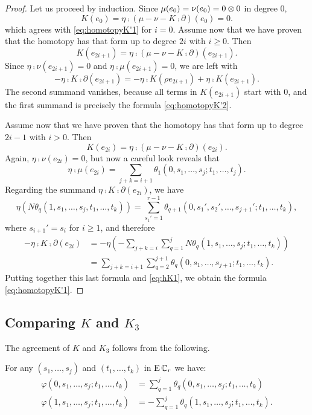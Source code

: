 \begin{proof}
 	Let us proceed by induction.
	Since $\mu(e_0) = \nu(e_0) = 0\otimes 0$ in degree $0$,
	\[
	K(e_0) = \eta \comp (\mu-\nu-K \comp \partial)(e_0) = 0.
	\]
	which agrees with \eqref{eq:homotopyK'1} for $i=0$.
	Assume now that we have proven that the homotopy has that form up to degree $2i$ with $i\geq 0$.
	Then
	\[K(e_{2i+1}) = \eta \comp (\mu-\nu-K \comp \partial)(e_{2i+1}).\]
	Since $\eta \comp \nu(e_{2i+1}) = 0$ and $\eta \comp \mu(e_{2i+1}) = 0$, we are left with
	\[-\eta \comp K \comp \partial(e_{2i+1}) = -\eta \comp K (\rho e_{2i+1}) + \eta \comp K (e_{2i+1}).
	\]
	The second summand vanishes, because all terms in $K(e_{2i+1})$ start with $0$, and the first summand is precisely the formula \eqref{eq:homotopyK'2}.

	Assume now that we have proven that the homotopy has that form up to degree $2i-1$ with $i>0$.
	Then
	\[K(e_{2i}) = \eta \comp (\mu-\nu-K \comp \partial)(e_{2i}).\]
	Again, $\eta \comp \nu(e_{2i}) = 0$, but now a careful look reveals that
	\begin{equation}\label{eq:hK1}\eta \comp \mu(e_{2i}) = \sum_{j+k=i+1}\theta_1(0,s_1,\dots,s_j;t_1,\dots,t_j).
	\end{equation}
	Regarding the summand $\eta \comp K \comp \partial(e_{2i})$, we have
	\[\eta(N\theta_q(1,s_1,\dots,s_j,t_1,\dots,t_k)) = \sum_{s_1' = 1}^{r-1}\theta_{q+1}(0,s_1',s_2',\dots,s_{j+1}';t_1,\dots,t_k),\]
	where $s_{i+1}' = s_i$ for $i\geq 1$, and therefore
	\begin{align*} \label{eq:hK2}
		-\eta \comp K \comp \partial(e_{2i})
		&= -\eta\left(-\sum_{j+k = i}\sum_{q=1}^j N\theta_q(1,s_1,\dots,s_j;t_1,\dots,t_k)\right) \\
		&= \sum_{j+k = i+1}\sum_{q=2}^{j+1}\theta_q(0,s_1,\dots,s_{j+1};t_1,\dots,t_k).
	\end{align*}
	Putting together this last formula and \eqref{eq:hK1}, we obtain the formula \eqref{eq:homotopyK'1}.
\end{proof}

\subsection{Comparing $K$ and $K_3$}\label{ss:comparins K and K3}

The agreement of $K$ and $K_3$ follows from the following.

\begin{lemma}
	For any $(s_1,\dots,s_j)$ and $(t_1,\dots,t_k)$ in $\operatorname{E}\mathbb{C}_r$ we have:
	\begin{align*}
		\varphi(0,s_1,\dots,s_j;t_1,\dots,t_k) &= \sum_{q=1}^j \theta_q(0,s_1,\dots,s_j;t_1,\dots,t_k) \\
		\varphi(1,s_1,\dots,s_j;t_1,\dots,t_k) &= -\sum_{q=1}^j \theta_q(1,s_1,\dots,s_j;t_1,\dots,t_k).
	\end{align*}
\end{lemma}

